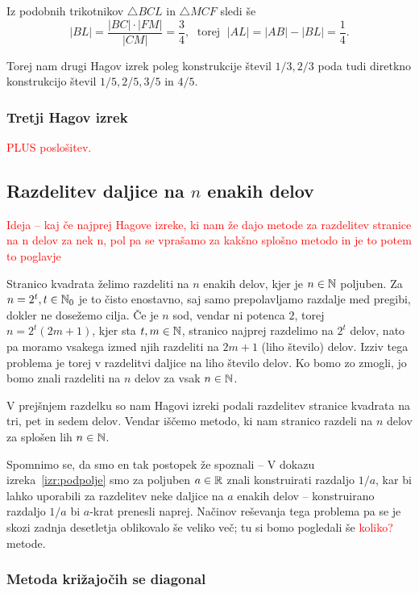 Iz podobnih trikotnikov $\triangle BCL$ in $\triangle MCF$ sledi še
$$ |BL| = \frac{|BC| \cdot |FM|}{|CM|} = \frac{3}{4}, \; \text{ torej } \; |AL| = |AB| - |BL| = \frac{1}{4}. $$

Torej nam drugi Hagov izrek poleg konstrukcije števil $1/3, 2/3$ poda tudi diretkno konstrukcijo števil $1/5, 2/5, 3/5$ in $4/5$.

\subsubsection{Tretji Hagov izrek}

\textcolor{red}{PLUS poslošitev.}



\subsection{Razdelitev daljice na $n$ enakih delov}

\textcolor{red}{Ideja -- kaj če najprej Hagove izreke, ki nam že dajo metode za razdelitev stranice na n delov za nek n, pol pa se vprašamo za kakšno splošno metodo in je to potem to poglavje}


Stranico kvadrata želimo razdeliti na $n$ enakih delov, kjer je $n \in \mathbb N$ poljuben. Za $n = 2^t, t \in \mathbb N_0$ je to čisto enostavno, saj samo prepolavljamo razdalje med pregibi, dokler ne dosežemo cilja. Če je $n$ sod, vendar ni potenca $2$, torej $n = 2^t(2m + 1)$, kjer sta $t, m \in \mathbb N$, stranico najprej razdelimo na $2^t$ delov, nato pa moramo vsakega izmed njih razdeliti na $2m + 1$ (liho število) delov. Izziv tega problema je torej v razdelitvi daljice na liho število delov. Ko bomo zo zmogli, jo bomo znali razdeliti na $n$ delov za vsak $n \in \mathbb N$.

V prejšnjem razdelku so nam Hagovi izreki podali razdelitev stranice kvadrata na tri, pet in sedem delov. Vendar iščemo metodo, ki nam stranico razdeli na $n$ delov za splošen lih $n \in \mathbb N$.

Spomnimo se, da smo en tak postopek že spoznali -- V dokazu izreka~\ref{izr:podpolje} smo za poljuben $a \in \mathbb R$ znali konstruirati razdaljo $1/a$, kar bi lahko uporabili za razdelitev neke daljice na $a$ enakih delov -- konstruirano razdaljo $1/a$ bi $a$-krat prenesli naprej. Načinov reševanja tega problema pa se je skozi zadnja desetletja oblikovalo še veliko več; tu si bomo pogledali še \textcolor{red}{koliko?} metode.

\subsubsection*{Metoda križajočih se diagonal}

